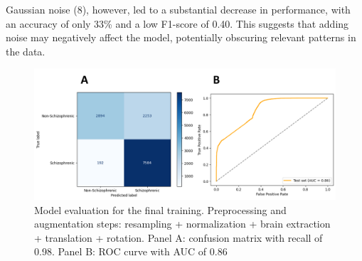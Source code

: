 Gaussian noise (8), however, led to a substantial decrease in performance, with an accuracy of only 33\% and a low F1-score of 0.40. This suggests that adding noise may negatively affect the model, potentially obscuring relevant patterns in the data.
\begin{figure}
    \centering
    \includegraphics[width=1.0\textwidth]{./figs/eval_final_model.png} %
    \caption{Model evaluation for the final training. Preprocessing and augmentation steps: resampling + normalization + brain extraction + translation + rotation. Panel A: confusion matrix with recall of 0.98. Panel B: ROC curve with AUC of 0.86}\label{fig:eval_final_model}
\end{figure}

